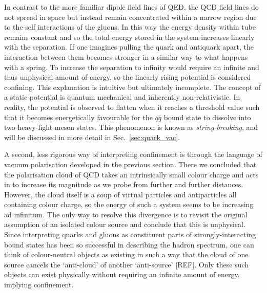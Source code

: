 \documentclass[12pt, a4paper, twoside]{book}
\begin{document}
In contrast to the more familiar dipole field lines of QED, the QCD field lines do not spread in space but instead remain concentrated within a narrow region due to the self interactions of the gluons. In this way the energy density within tube remains constant and so the total energy stored in the system increases linearly with the separation. If one imagines pulling the quark and antiquark apart, the interaction between them becomes stronger in a similar way to what happens with a spring. To increase the separation to infinity would require an infinite and thus unphysical amount of energy, so the linearly rising potential is considered confining. This explanation is intuitive but ultimately incomplete. The concept of a static potential is quantum mechanical and inherently non-relativistic. In reality, the potential is observed to flatten when it reaches a threshold value such that it becomes energetically favourable for the \(q\bar{q}\) bound state to dissolve into two heavy-light meson states. This phenomenon is known as \emph{string-breaking}, and will be discussed in more detail in Sec.~\ref{sec:quark_vac}.

A second, less rigorous way of interpreting confinement is through the language of vacuum polarisation developed in the previous section. There we concluded that the polarisation cloud of QCD takes an intrinsically small colour charge and acts in to increase its magnitude as we probe from further and further distances. However, the cloud itself is a soup of virtual particles and antiparticles all containing colour charge, so the energy of such a system seems to be increasing ad infinitum. The only way to resolve this divergence is to revisit the original assumption of an isolated colour source and conclude that this is unphysical. Since interpreting quarks and gluons as constituent parts of strongly-interacting bound states has been so successful in describing the hadron spectrum, one can think of colour-neutral objects as existing in such a way that the cloud of one source cancels the `anti-cloud' of another `anti-source' [REF]. Only these such objects can exist physically without requiring an infinite amount of energy, implying confinement.
\end{document}
